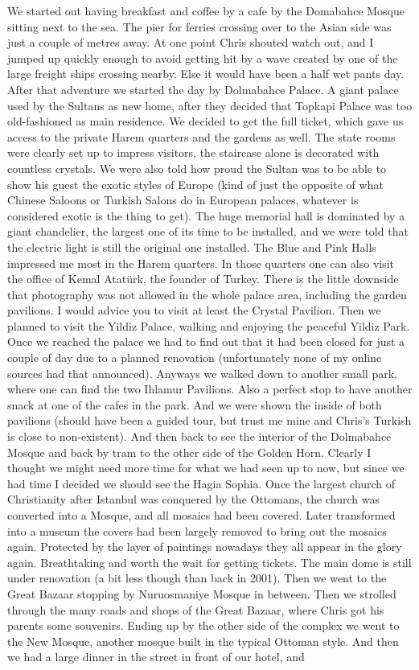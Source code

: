 We started out having breakfast and coffee by a cafe by the Domabahce Mosque sitting next to the sea. The pier for ferries crossing over to the Asian side was just a couple of metres away. At one point Chris shouted watch out, and I jumped up quickly enough to avoid getting hit by a wave created by one of the large freight ships crossing nearby. Else it would have been a half wet pants day. After that adventure we started the day by Dolmabahce Palace. A giant palace used by the Sultans as new home, after they decided that Topkapi Palace was too old-fashioned as main residence. We decided to get the full ticket, which gave us access to the private Harem quarters and the gardens as well. The state rooms were clearly set up to impress visitors, the staircase alone is decorated with countless crystals. We were also told how proud the Sultan was to be able to show his guest the exotic styles of Europe (kind of just the opposite of what Chinese Saloons or Turkish Salons do in European palaces, whatever is considered exotic is the thing to get). The huge memorial hall is dominated by a giant chandelier, the largest one of its time to be installed, and we were told that the electric light is still the original one installed. The Blue and Pink Halls impressed me most in the Harem quarters. In those quarters one can also visit the office of Kemal Atat\"urk, the founder of Turkey. There is the little downside that photography was not allowed in the whole palace area, including the garden pavilions. I would advice you to visit at least the Crystal Pavilion. Then we planned to visit the Yildiz Palace, walking and enjoying the peaceful Yildiz Park. Once we reached the palace we had to find out that it had been closed for just a couple of day due to a planned renovation (unfortunately none of my online sources had that announced). Anyways we walked down to another small park, where one can find the two Ihlamur Pavilions. Also a perfect stop to have another snack at one of the cafes in the park. And we were shown the inside of both pavilions (should have been a guided tour, but trust me mine and Chris's Turkish is close to non-existent). And then back to see the interior of the Dolmabahce Mosque and back by tram to the other side of the Golden Horn. Clearly I thought we might need more time for what we had seen up to now, but since we had time I decided we should see the Hagia Sophia. Once the largest church of Christianity after Istanbul was conquered by the Ottomans, the church was converted into a Mosque, and all mosaics had been covered. Later transformed into a museum the covers had been largely removed to bring out the mosaics again. Protected by the layer of paintings nowadays they all appear in the glory again. Breathtaking and worth the wait for getting tickets. The main dome is still under renovation (a bit less though than back in 2001). Then we went to the Great Bazaar stopping by Nuruosmaniye Mosque in between. Then we strolled through the many roads and shops of the Great Bazaar, where Chris got his parents some souvenirs. Ending up by the other side of the complex we went to the New Mosque, another mosque built in the typical Ottoman style. And then we had a large dinner in the street in front of our hotel, and 